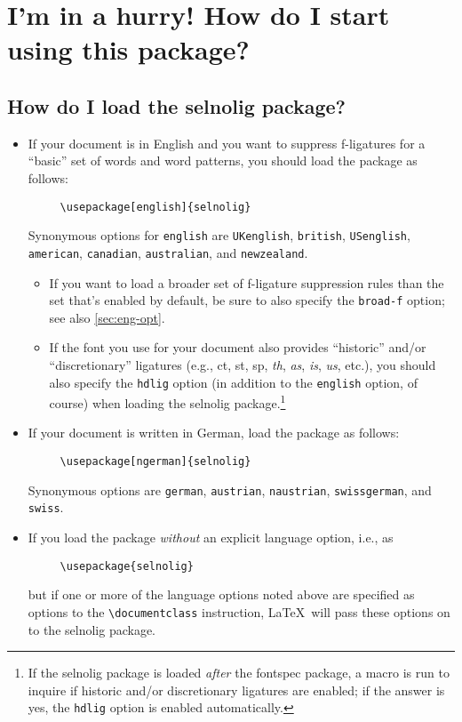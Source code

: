 \documentclass[12pt]{article}
\newcommand{\pkg}[1]{\textsf{#1}}
\newcommand{\opt}[1]{\texttt{#1}}
\newcommand{\cmmd}[1]{\texttt{\textbackslash #1}}
\begin{document}
\section{I'm in a hurry! How do I start using this package?}

\subsection[How do I load the selnolig package?]{How do I load the \pkg{selnolig} package?}

\begin{itemize}
\item If your document is in English and you want to suppress f-ligatures for a \enquote{basic} set of words and word patterns, you should load the package as follows:
\begin{Verbatim}
     \usepackage[english]{selnolig}
\end{Verbatim}
Synonymous options for \opt{english} are \opt{UKenglish}, \opt{british}, \opt{USenglish}, \opt{american}, \opt{cana\-dian}, \opt{australian}, and \opt{new\-zealand}.

\begin{itemize}
\item If you want to load a broader set of f-ligature suppression rules than the set that's enabled by default, be sure to also specify the \opt{broad-f} option; see also \cref{sec:eng-opt}.

\item If the font you use for your document also provides \enquote{historic} and/or \enquote{discretionary} ligatures (e.g., ct, st, sp, \emph{th}, \emph{as}, \emph{is}, \emph{us}, etc.), you should also specify the \opt{hdlig} option (in addition to the \opt{english} option, of course) when loading the \pkg{selnolig} package.\footnote{If the \pkg{selnolig} package is loaded \emph{after} the \pkg{fontspec} package, a macro is run to inquire if historic and/or discretionary ligatures are enabled; if the answer is yes, the \opt{hdlig} option is enabled automatically.}
\end{itemize}
\item If your document is written in German, load the package as follows:
\begin{Verbatim}
     \usepackage[ngerman]{selnolig}
\end{Verbatim}
Synonymous options are \opt{german}, \opt{austrian}, \opt{naustrian},  \opt{swissgerman}, and \opt{swiss}.

\item If you load the package \emph{without} an explicit language option, i.e., as
\begin{Verbatim}
     \usepackage{selnolig}
\end{Verbatim}
but if one or more of the language options noted above are specified as options to the \cmmd{documentclass} instruction, \LaTeX\ will pass these options on to the \pkg{selnolig} package.


\end{itemize}
\end{document}

